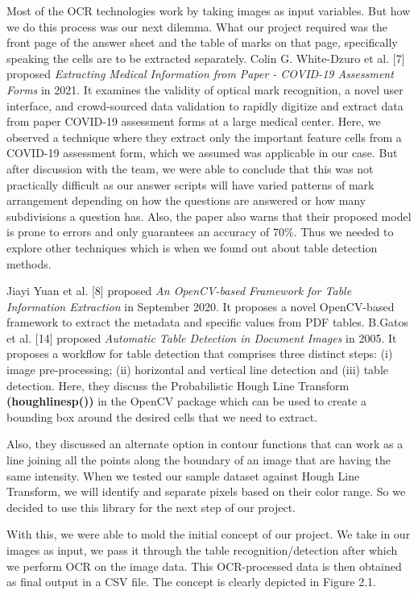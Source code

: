 \noindent
Most of the OCR technologies work by taking images as input variables. But how we do this process was our next dilemma. What our project required was the front page of the answer sheet and the table of marks on that page, specifically speaking the cells are to be extracted separately. Colin G. White-Dzuro et al. [7] proposed {\it Extracting Medical Information from Paper - COVID-19 Assessment Forms} in 2021. It examines the validity of optical mark recognition, a novel user interface, and crowd-sourced data validation to rapidly digitize and extract data from paper COVID-19 assessment forms at a large medical center. Here, we observed a technique where they extract only the important feature cells from a COVID-19 assessment form, which we assumed was applicable in our case. But after discussion with the team, we were able to conclude that this was not practically difficult as our answer scripts will have varied patterns of mark arrangement depending on how the questions are answered or how many subdivisions a question has. Also, the paper also warns that their proposed model is prone to errors and only guarantees an accuracy of 70\%. Thus we needed to explore other techniques which is when we found out about table detection methods.

\noindent
Jiayi Yuan et al. [8] proposed {\it An OpenCV-based Framework for Table Information Extraction} in September 2020. It proposes a novel OpenCV-based framework to extract the metadata and specific values from PDF tables. B.Gatos et al. [14] proposed {\it Automatic Table Detection in Document Images} in 2005. It proposes a workflow for table detection that comprises three distinct steps: (i) image pre-processing; (ii) horizontal and vertical line detection and (iii) table detection. Here, they discuss the Probabilistic Hough Line Transform \textbf{(houghlinesp())} in the OpenCV package which can be used to create a bounding box around the desired cells that we need to extract. 

\clearpage

\noindent
Also, they discussed an alternate option in contour functions that can work as a line joining all the points along the boundary of an image that are having the same intensity. When we tested our sample dataset against Hough Line Transform, we will identify and separate pixels based on their color range. So we decided to use this library for the next step of our project.

\noindent
With this, we were able to mold the initial concept of our project. We take in our images as input, we pass it through the table recognition/detection after which we perform OCR on the image data. This OCR-processed data is then obtained as final output in a CSV file. The concept is clearly depicted in Figure 2.1.

